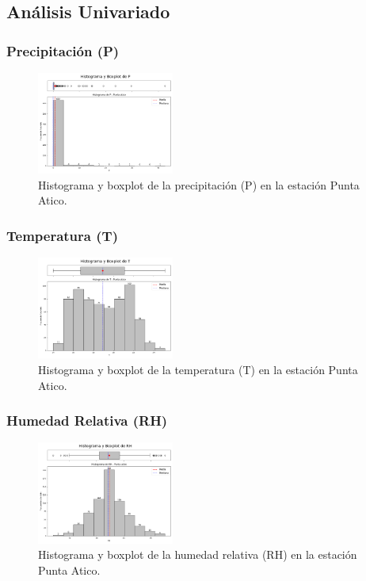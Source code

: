 \subsection{Análisis Univariado}

\subsubsection*{Precipitación (P)}
\begin{figure}[H]
\centering
\includegraphics[width=0.4\textwidth]{resultados/por_estacion_meteorologica/Punta_Atico/P_histograma.png}
\caption{Histograma y boxplot de la precipitación (P) en la estación Punta Atico.}
\label{fig:punta_atico_P}
\end{figure}

\subsubsection*{Temperatura (T)}
\begin{figure}[H]
\centering
\includegraphics[width=0.4\textwidth]{resultados/por_estacion_meteorologica/Punta_Atico/T_histograma.png}
\caption{Histograma y boxplot de la temperatura (T) en la estación Punta Atico.}
\label{fig:punta_atico_T}
\end{figure}

\subsubsection*{Humedad Relativa (RH)}
\begin{figure}[H]
\centering
\includegraphics[width=0.4\textwidth]{resultados/por_estacion_meteorologica/Punta_Atico/RH_histograma.png}
\caption{Histograma y boxplot de la humedad relativa (RH) en la estación Punta Atico.}
\label{fig:punta_atico_RH}
\end{figure}

